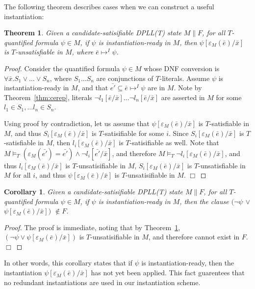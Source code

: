 \documentclass{llncs}
\newtheorem{thm}{Theorem}
\newtheorem{cor}{Corollary}
\begin{document}
The following theorem describes cases when we can construct a useful instantiation:

\begin{thm}
\label{thm:instready}
Given a candidate-satisifiable DPLL(T) state $M \parallel F$, for all $T$-quantified formula $\psi \in M$, if $\psi$ is instantiation-ready in $M$, then $\psi[\varepsilon_M( \bar{e} )/\bar{x}]$ is $T$-unsatisfiable in $M$, where $\bar{e} \mapsto^I \psi$.
\end{thm}
\begin{proof}
Consider the quantified formula $\psi \in M$ whose DNF conversion is $\forall \bar{x}. S_1 \vee \ldots \vee S_n$, where $S_1 \ldots S_n$ are conjunctions of $T$-literals.
Assume $\psi$ is instantiation-ready in $M$, and that $\bar{e'} \subseteq \bar{e} \mapsto^I \psi$ are in $M$.
Note by Theorem~\ref{thm:cerep}, literals $\neg l_1 [\bar{e}/\bar{x}] \ldots \neg l_n [ \bar{e}/\bar{x} ]$ are asserted in $M$ for some $l_1 \in S_1, \ldots l_n \in S_n$.

Using proof by contradiction, let us assume that $\psi[\varepsilon_M( \bar{e} )/\bar{x}]$ is $T$-satisfiable in $M$, and thus $S_i[\varepsilon_M( \bar{e} )/\bar{x}]$ is $T$-satisifiable for some $i$.
Since $S_i[\varepsilon_M(\bar{e})/\bar{x}]$ is $T$-satisfiable in $M$, then $l_i[\varepsilon_M( \bar{e} )/\bar{x}]$ is $T$-satisifiable as well.
Note that $M \models_T (\varepsilon_M(\bar{e'}) = \bar{e'}) \wedge \neg l_i[\bar{e'}/\bar{x}]$, and therefore $M \models_T \neg l_i[\varepsilon_M(\bar{e})/\bar{x}]$, and thus $l_i[\varepsilon_M(\bar{e})/\bar{x}]$ is $T$-unsatisifiable in $M$, $S_i[\varepsilon_M(\bar{e})/\bar{x}]$ is $T$-unsatisfiable in $M$ for all $i$, and thus $\psi[\varepsilon_M(\bar{e})/\bar{x}]$ is $T$-unsatisifiable in $M$. $\Box$
\end{proof}

\begin{cor}
Given a candidate-satisifiable DPLL(T) state $M \parallel F$, for all $T$-quantified formula $\psi \in M$,
if $\psi$ is instantiation-ready in $M$, then the clause $( \neg \psi$ $\vee$ $\psi[\varepsilon_M( \bar{e} )/\bar{x}])$ $\not\in F$.
\end{cor}
\begin{proof}
The proof is immediate, noting that by Theorem~\ref{thm:instready}, $( \neg \psi \vee \psi[\varepsilon_M( \bar{e} )/\bar{x}])$ is $T$-unsatisifiable in $M$, and therefore cannot exist in $F$. $\Box$
\end{proof}

In other words, this corollary states that if $\psi$ is instantiation-ready, then the instantiation $\psi[\varepsilon_M( \bar{e} )/\bar{x}]$ has not yet been applied.
This fact guarentees that no redundant instantiations are used in our instantiation scheme.
\end{document}
